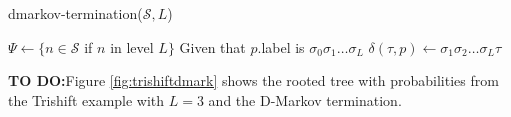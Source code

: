 {  \begin{algorithm}
  \caption{dmarkov-termination($\mathcal{S}, L$)\label{alg:dmarkterm}}
    \begin{algorithmic}[1]
      	\State $\Psi \gets \{n \in \mathcal{S}$ if $n$ in level $L\}$
      		\State Given that $p$.label is $\sigma_0\sigma_1\ldots\sigma_L$
      		\For{$\tau \in \Sigma$}
      			\State $\delta(\tau, p) \gets \sigma_1\sigma_2\ldots\sigma_L\tau$
      		\EndFor
      	\EndFor
      \EndProcedure
    \end{algorithmic}
  \end{algorithm}
  
\textbf{TO DO:}Figure \ref{fig:trishiftdmark} shows the rooted tree with probabilities from the Trishift example with $L=3$ and the D-Markov termination.

}
